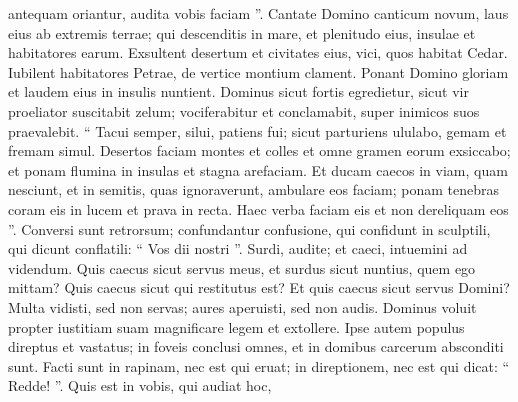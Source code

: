 \begin{biblechapter}
\begin{biblechapter}
\begin{biblechapter}
\begin{biblechapter}
\begin{biblechapter}
\begin{biblechapter}
\begin{biblechapter}
\begin{biblechapter}
\begin{biblechapter}
\begin{biblechapter}
\begin{biblechapter}
\begin{biblechapter}
\begin{biblechapter}
\begin{biblechapter}
\begin{biblechapter}
\begin{biblechapter}
\begin{biblechapter}
\begin{biblechapter}
\begin{biblechapter}
\begin{biblechapter}
\begin{biblechapter}
\begin{biblechapter}
\begin{biblechapter}
\begin{biblechapter}
\begin{biblechapter}
\begin{biblechapter}
\begin{biblechapter}
\begin{biblechapter}
\begin{biblechapter}
\begin{biblechapter}
\begin{biblechapter}
\begin{biblechapter}
\begin{biblechapter}
\begin{biblechapter}
\begin{biblechapter}
\begin{biblechapter}
\begin{biblechapter}
\begin{biblechapter}
\begin{biblechapter}
\begin{biblechapter}
\begin{biblechapter}
\begin{biblechapter}
 antequam oriantur, audita vobis faciam ”.
 \verse Cantate Domino canticum novum,
 laus eius ab extremis terrae;
 qui descenditis in mare, et plenitudo eius,
 insulae et habitatores earum.
 \verse Exsultent desertum et civitates eius,
 vici, quos habitat Cedar.
 Iubilent habitatores Petrae,
 de vertice montium clament.
 \verse Ponant Domino gloriam
 et laudem eius in insulis nuntient.
 \verse Dominus sicut fortis egredietur,
 sicut vir proeliator suscitabit zelum;
 vociferabitur et conclamabit,
 super inimicos suos praevalebit.
 \verse “ Tacui semper, silui, patiens fui;
 sicut parturiens ululabo,
 gemam et fremam simul.
 \verse Desertos faciam montes et colles
 et omne gramen eorum exsiccabo;
 et ponam flumina in insulas
 et stagna arefaciam.
 \verse Et ducam caecos in viam, quam nesciunt,
 et in semitis, quas ignoraverunt, ambulare eos faciam;
 ponam tenebras coram eis in lucem
 et prava in recta.
 Haec verba faciam eis
 et non dereliquam eos ”.
 \verse Conversi sunt retrorsum;
 confundantur confusione, qui confidunt in sculptili,
 qui dicunt conflatili:
 “ Vos dii nostri ”.
 \verse Surdi, audite;
 et caeci, intuemini ad videndum.
 \verse Quis caecus sicut servus meus,
 et surdus sicut nuntius, quem ego mittam?
 Quis caecus sicut qui restitutus est?
 Et quis caecus sicut servus Domini?
 \verse Multa vidisti, sed non servas;
 aures aperuisti, sed non audis.
 \verse Dominus voluit propter iustitiam suam
 magnificare legem et extollere.
 \verse Ipse autem populus direptus et vastatus;
 in foveis conclusi omnes,
 et in domibus carcerum absconditi sunt.
 Facti sunt in rapinam, nec est qui eruat;
 in direptionem, nec est qui dicat: “ Redde! ”.
 \verse Quis est in vobis, qui audiat hoc,

\end{biblechapter}
\end{biblechapter}
\end{biblechapter}
\end{biblechapter}
\end{biblechapter}
\end{biblechapter}
\end{biblechapter}
\end{biblechapter}
\end{biblechapter}
\end{biblechapter}
\end{biblechapter}
\end{biblechapter}
\end{biblechapter}
\end{biblechapter}
\end{biblechapter}
\end{biblechapter}
\end{biblechapter}
\end{biblechapter}
\end{biblechapter}
\end{biblechapter}
\end{biblechapter}
\end{biblechapter}
\end{biblechapter}
\end{biblechapter}
\end{biblechapter}
\end{biblechapter}
\end{biblechapter}
\end{biblechapter}
\end{biblechapter}
\end{biblechapter}
\end{biblechapter}
\end{biblechapter}
\end{biblechapter}
\end{biblechapter}
\end{biblechapter}
\end{biblechapter}
\end{biblechapter}
\end{biblechapter}
\end{biblechapter}
\end{biblechapter}
\end{biblechapter}
\end{biblechapter}
